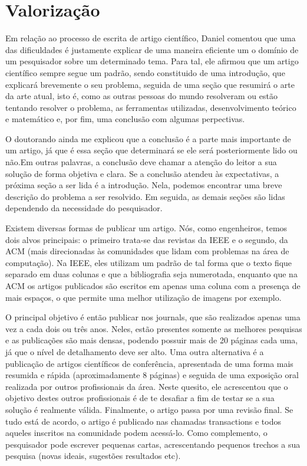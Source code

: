 \documentclass{article}
\begin{document}
\section{Valorização}

Em relação ao processo de escrita de artigo científico, Daniel comentou que uma
das dificuldades é justamente explicar de uma maneira eficiente um o domínio de
um pesquisador sobre um determinado tema. Para tal, ele afirmou que um artigo
científico sempre segue um padrão, sendo constituido de uma introdução, que
explicará brevemente o seu problema, seguida de uma seção que resumirá o arte da
arte atual, isto é, como as outras pessoas do mundo resolveram ou estão tentando
resolver o problema, as ferramentas utilizadas, desenvolvimento teórico e
matemático e, por fim, uma conclusão com algumas perpectivas.

\vspace{12pt}

O doutorando ainda me explicou que a conclusão é a parte mais importante de um
artigo, já que é essa seção que determinará se ele será posteriormente lido ou
não.Em outras palavras, a conclusão deve chamar a atenção do leitor a sua
solução de forma objetiva e clara. Se a conclusão atendeu às expectativas, a
próxima seção a ser lida é a introdução. Nela, podemos encontrar uma breve
descrição do problema a ser resolvido. Em seguida, as demais seções são lidas
dependendo da necessidade do pesquisador.

\vspace{12pt}

Existem diversas formas de publicar um artigo. Nós, como engenheiros, temos dois
alvos principais: o primeiro trata-se das revistas da IEEE e o segundo, da ACM
(mais direcionadas às comunidades que lidam com problemas na área de
computação). Na IEEE, eles utilizam um padrão de tal forma que o texto fique
separado em duas colunas e que a bibliografia seja numerotada, enquanto que na
ACM os artigos publicados são escritos em apenas uma coluna com a presença de
mais espaços, o que permite uma melhor utilização de imagens por exemplo. 

\vspace{12pt}

O principal objetivo é então publicar nos journals, que são realizados apenas
uma vez a cada dois ou três anos. Neles, estão presentes somente as melhores
pesquisas e as publicações são mais densas, podendo possuir mais de 20 páginas
cada uma, já que o nível de detalhamento deve ser alto. Uma outra alternativa é
a publicação de artigos científicos de conferência, apresentada de uma forma
mais resumida e rápida (aproximadamente 8 páginas) e seguida de uma exposição
oral realizada por outros profissionais da área. Neste quesito, ele acrescentou
que o objetivo destes outros profissionais é de te desafiar a fim de testar se
a sua solução é realmente válida. Finalmente, o artigo passa por uma revisão
final. Se tudo está de acordo, o artigo é publicado nas chamadas transactions e
todos aqueles inscritos na comunidade podem acessá-lo. Como complemento, o
pesquisador pode escrever pequenas cartas, acrescentando pequenos trechos a sua
pesquisa (novas ideais, sugestões resultados etc).
\end{document}
